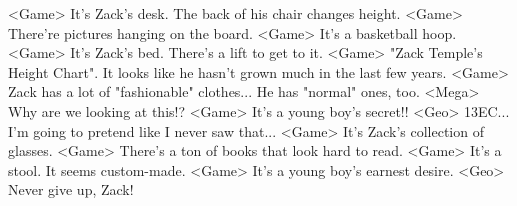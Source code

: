 <Game> It's Zack's desk. 
The back of his chair changes height. 
<Game> There're pictures hanging on the board. 
<Game> It's a basketball hoop. 
<Game> It's Zack's bed. 
There's a lift to get to it. 
<Game> "Zack Temple's Height Chart". 
It looks like he hasn't grown much in the last few years. 
<Game> Zack has a lot of "fashionable" clothes... 
He has "normal" ones, too. 
<Mega> Why are we looking at this!? 
<Game> It's a young boy's secret!! 
<Geo> {13}{EC}... 
I'm going to pretend like I never saw that... 
<Game> It's Zack's collection of glasses. 
<Game> There's a ton of books that look hard to read. 
<Game> It's a stool. 
It seems custom-made. 
<Game> It's a young boy's earnest desire. 
<Geo> Never give up, Zack! 
